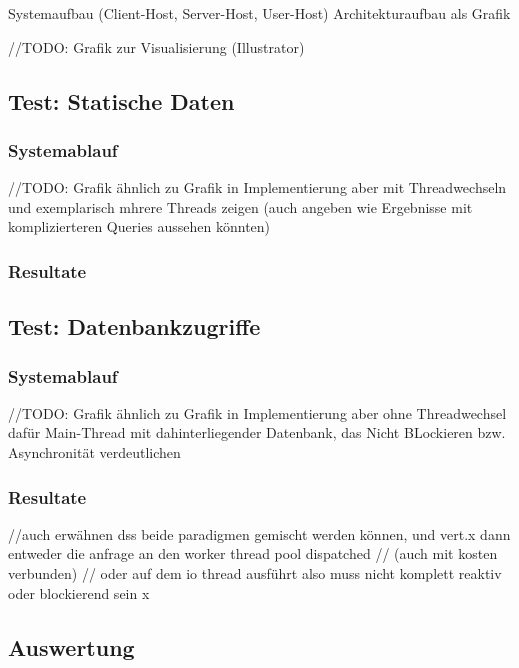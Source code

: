 Systemaufbau (Client-Host, Server-Host, User-Host)
Architekturaufbau als Grafik

//TODO: Grafik zur Visualisierung (Illustrator)
\subsection{Test: Statische Daten}
\label{section:statische_daten}

\subsubsection{Systemablauf}
//TODO: Grafik ähnlich zu Grafik in Implementierung aber mit Threadwechseln und exemplarisch mhrere Threads zeigen
(auch angeben wie Ergebnisse mit komplizierteren Queries aussehen könnten)
\subsubsection{Resultate}

\subsection{Test: Datenbankzugriffe}
\label{section:datenbankzugriffe}

\subsubsection{Systemablauf}
//TODO: Grafik ähnlich zu Grafik in Implementierung aber ohne Threadwechsel dafür Main-Thread mit dahinterliegender Datenbank,
das Nicht BLockieren bzw. Asynchronität verdeutlichen

\subsubsection{Resultate}

//auch erwähnen dss beide paradigmen gemischt werden können, und vert.x dann entweder die anfrage an den worker thread pool dispatched
// (auch mit kosten verbunden)
// oder auf dem io thread ausführt also muss nicht komplett reaktiv oder blockierend sein x
\subsection{Auswertung}

\label{section:auswertung}